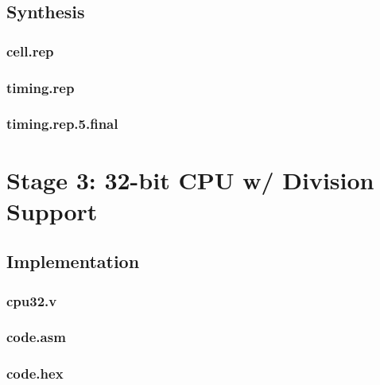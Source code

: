 \documentclass[11pt,letterpaper,final]{article}
\begin{document}
\subsection{Synthesis}
\subsubsection{cell.rep}
\label{s2/cell.rep}
\begin{scriptsize}
\end{scriptsize}
\subsubsection{timing.rep}
\label{s2/timing.rep}
\begin{scriptsize}
\end{scriptsize}
\subsubsection{timing.rep.5.final}
\label{s2/timing.rep.5.final}
\begin{scriptsize}
\end{scriptsize}

\section{ Stage 3: 32-bit CPU w/ Division Support }

\subsection{Implementation}
\subsubsection{cpu32.v}
\label{s3/cpu32.v}
\begin{scriptsize}
\end{scriptsize}
\subsubsection{code.asm}
\label{s3/code.asm}
\begin{scriptsize}
\end{scriptsize}
\subsubsection{code.hex}
\label{s3/code.hex}
\begin{scriptsize}
\end{scriptsize}
\end{document}
